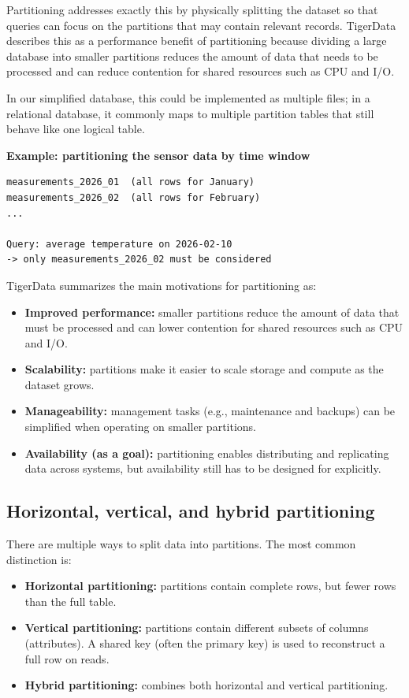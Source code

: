 Partitioning addresses exactly this by physically splitting the dataset so that
queries can focus on the partitions that may contain relevant records.
TigerData describes this as a performance benefit of partitioning because
dividing a large database into smaller partitions reduces the amount of data
that needs to be processed and can reduce contention for shared resources such
as CPU and I/O.\cite{TigerData:01}

In our simplified database, this could be implemented as multiple files; in a
relational database, it commonly maps to multiple partition tables that still
behave like one logical table.\cite{TigerData:01}

\textbf{Example: partitioning the sensor data by time window}
\begin{verbatim}
measurements_2026_01  (all rows for January)
measurements_2026_02  (all rows for February)
...

Query: average temperature on 2026-02-10
-> only measurements_2026_02 must be considered
\end{verbatim}

TigerData summarizes the main motivations for partitioning as:
\begin{itemize}
  \item \textbf{Improved performance:} smaller partitions reduce the amount of data that must be processed and can lower contention for shared resources such as CPU and I/O.\cite{TigerData:01}
  \item \textbf{Scalability:} partitions make it easier to scale storage and compute as the dataset grows.\cite{TigerData:01}
  \item \textbf{Manageability:} management tasks (e.g., maintenance and backups) can be simplified when operating on smaller partitions.\cite{TigerData:01}
  \item \textbf{Availability (as a goal):} partitioning enables distributing and replicating data across systems, but availability still has to be designed for explicitly.\cite{TigerData:01}
\end{itemize}

\subsection{Horizontal, vertical, and hybrid partitioning}

There are multiple ways to split data into partitions. The most common
distinction is:

\begin{itemize}
  \item \textbf{Horizontal partitioning:} partitions contain complete rows, but fewer rows than the full table.
  \item \textbf{Vertical partitioning:} partitions contain different subsets of columns (attributes). A shared key (often the primary key) is used to reconstruct a full row on reads.
  \item \textbf{Hybrid partitioning:} combines both horizontal and vertical partitioning.
\end{itemize}

